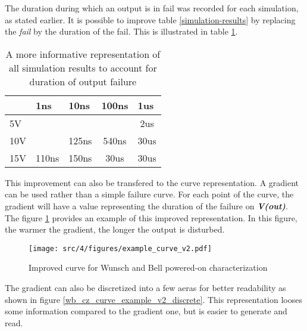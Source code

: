 The duration during which an output is in fail was recorded for each simulation, as stated earlier.
It is possible to improve table \ref{simulation-results} by replacing the \textit{fail} by the duration of the fail.
This is illustrated in table \ref{simulation-results-bis}.

\begin{table}[!h]
\centering
\begin{tabular}{@{}lcccc@{}}
\toprule
    & \multicolumn{1}{l}{1ns}      & \multicolumn{1}{l}{10ns}     & \multicolumn{1}{l}{100ns}    & \multicolumn{1}{l}{1us}     \\ \midrule
5V  & {\color[HTML]{32CB00} }      & {\color[HTML]{32CB00} }      & {\color[HTML]{32CB00} }      & {\color[HTML]{F56B00} 2us}  \\
10V & {\color[HTML]{32CB00} }      & {\color[HTML]{00D2CB} 125ns} & {\color[HTML]{F8A102} 540ns} & {\color[HTML]{FE0000} 30us} \\
15V & {\color[HTML]{00D2CB} 110ns} & {\color[HTML]{FFCB2F} 150ns} & {\color[HTML]{FE0000} 30us}  & {\color[HTML]{FE0000} 30us} \\ \bottomrule
\end{tabular}
\caption{A more informative representation of all simulation results to account for duration of output failure}
\label{simulation-results-bis}
\end{table}

This improvement can also be transfered to the curve representation.
A gradient can be used rather than a simple failure curve.
For each point of the curve, the gradient will have a value representing the duration of the failure on \textbf{\textit{V(out)}}.
The figure \ref{wb_cz_curve_example_v2} provides an example of this improved representation.
In this figure, the warmer the gradient, the longer the output is disturbed.

\begin{figure}[!h]
  \centering
  \texttt{[image: src/4/figures/example\_curve\_v2.pdf]}
  \caption{Improved curve for Wunsch and Bell powered-on characterization}
  \label{wb_cz_curve_example_v2}
\end{figure}

The gradient can also be discretized into a few aeras for better readability as shown in figure \ref{wb_cz_curve_example_v2_discrete}.
This representation looses some information compared to the gradient one, but is easier to generate and read.

